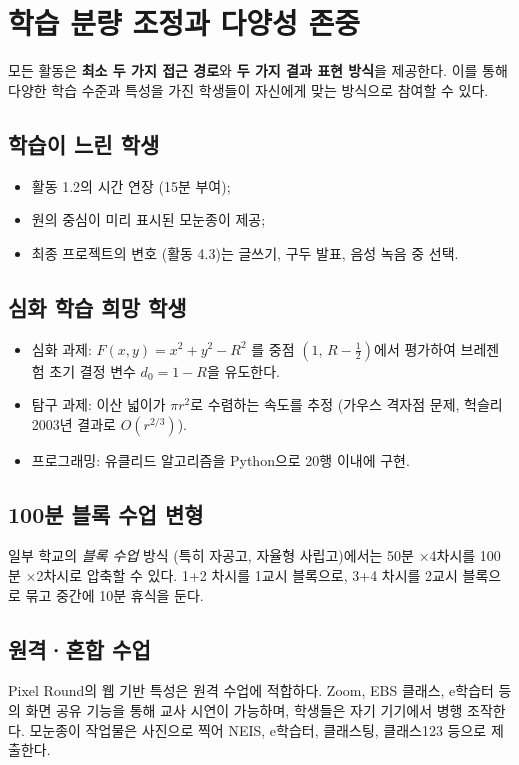 \documentclass[12pt,a4paper]{scrartcl}
\newcommand{\acc}[1]{\textcolor{accent}{\textbf{#1}}}
\begin{document}
\section{학습 분량 조정과 다양성 존중}\label{sec:bun}

모든 활동은 \acc{최소 두 가지 접근 경로}와 \acc{두 가지 결과 표현 방식}을 제공한다. 이를 통해 다양한 학습 수준과 특성을 가진 학생들이 자신에게 맞는 방식으로 참여할 수 있다.

\subsection{학습이 느린 학생}
\begin{itemize}[leftmargin=1.3em,itemsep=0.15em,topsep=0.3em]
  \item 활동 1.2의 시간 연장 (15분 부여);
  \item 원의 중심이 미리 표시된 모눈종이 제공;
  \item 최종 프로젝트의 변호 (활동 4.3)는 글쓰기, 구두 발표, 음성 녹음 중 선택.
\end{itemize}

\subsection{심화 학습 희망 학생}
\begin{itemize}[leftmargin=1.3em,itemsep=0.15em,topsep=0.3em]
  \item 심화 과제: $F(x, y) = x^2 + y^2 - R^2$ 를 중점 $(1,\, R - \tfrac{1}{2})$에서 평가하여 브레젠험 초기 결정 변수 $d_0 = 1 - R$을 유도한다.
  \item 탐구 과제: 이산 넓이가 $\pi r^2$로 수렴하는 속도를 추정 (가우스 격자점 문제, 헉슬리 2003년 결과로 $O(r^{2/3})$).
  \item 프로그래밍: 유클리드 알고리즘을 Python으로 20행 이내에 구현.
\end{itemize}

\subsection{100분 블록 수업 변형}
일부 학교의 \emph{블록 수업} 방식 (특히 자공고, 자율형 사립고)에서는 50분 ×4차시를 100분 ×2차시로 압축할 수 있다. 1+2 차시를 1교시 블록으로, 3+4 차시를 2교시 블록으로 묶고 중간에 10분 휴식을 둔다.

\subsection{원격·혼합 수업}
Pixel Round의 웹 기반 특성은 원격 수업에 적합하다. Zoom, EBS 클래스, e학습터 등의 화면 공유 기능을 통해 교사 시연이 가능하며, 학생들은 자기 기기에서 병행 조작한다. 모눈종이 작업물은 사진으로 찍어 NEIS, e학습터, 클래스팅, 클래스123 등으로 제출한다.
\end{document}
